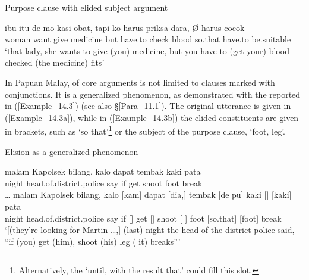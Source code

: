 \begin{styleExampleTitle}
Purpose clause with elided subject argument
\end{styleExampleTitle}
\ea
\label{Example_14.2}
\gll ibu itu de mo kasi obat, tapi ko harus  priksa dara,  Ø harus cocok\\    
woman   want give medicine but  have.to  check blood so.that {}  have.to be.suitable\\
\glt ‘that lady, she wants to give (you) medicine, but you have to (get your) blood checked  (the medicine) fits’ \textstyleExampleSource{[080917-007-CvHt.0003]}
\z

\noindent In Papuan Malay,  of core arguments is not limited to clauses marked with conjunctions. It is a generalized phenomenon, as demonstrated with the reported  in (\ref{Example_14.3}) (see also §\ref{Para_11.1}). The original utterance is given in (\ref{Example_14.3a}), while in (\ref{Example_14.3b}) the elided constituents are given in brackets, such as   ‘so that’\footnote{Alternatively, the   ‘until, with the result that’ could fill this slot.} or the subject of the purpose clause,  ‘foot, leg’.


\begin{styleExampleTitle}
Elision as a generalized phenomenon
\end{styleExampleTitle}
\ea
\label{Example_14.3}
\ea
\label{Example_14.3a}
\gll   {\ldots} malam Kapolsek bilang, kalo dapat  tembak kaki pata\\ 
    {} night head.of.district.police say if get  shoot foot break\\
\vspace{5pt}
\ex
\label{Example_14.3b}
\gll
  {\ldots} malam Kapolsek bilang, kalo [kam] dapat   [dia,] tembak {[de pu]} kaki [] [kaki] pata\\
   {} night head.of.district.police say if [] get   [] shoot {[ ]} foot [so.that] [foot] break\\
 ‘[(they’re looking for Martin {\ldots},] (last) night the head of the district police said, ``if (you) get (him), shoot (his) leg ( it) breaks''' \textstyleExampleSource{[081011-009-Cv.0048/0050]}\\
\z
\z


